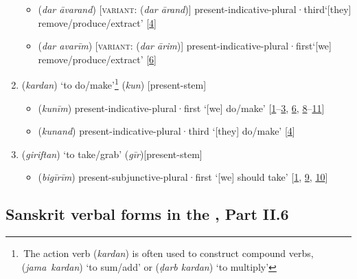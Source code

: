 \begin{enumerate}
\begin{itemize}
        \item {} (\textit{dar āvarand}) [\textsc{variant}:  (\textit{dar ārand})] \acrshort{present}-\acrshort{indicative}-\acrshort{plural}·\acrshort{third}\newline `[they] remove/produce/extract' [\hyperlink{Ppass4}{4}]
        \item {} (\textit{dar avarīm}) [\textsc{variant}:  (\textit{dar ārim})]
        \acrshort{present}-\acrshort{indicative}-\acrshort{plural}·\acrshort{first}\newline `[we] remove/produce/extract' [\hyperlink{Ppass6}{6}]
    \end{itemize}
    \item {} (\textit{kardan}) `to do/make'\footnote{\,The action verb  (\textit{kardan}) is often used to construct compound verbs, \eg {} (\textit{jama}\Ayn\ \textit{kardan}) `to sum/add' or  (\textit{ḍarb kardan}) `to multiply'\label{compound_action_verb_persian}} \hfill  {} (\textit{kun}) [\acrshort{present}-\acrshort{stem}]
    \begin{itemize}
        \item {} (\textit{kunīm}) \acrshort{present}-\acrshort{indicative}-\acrshort{plural}·\acrshort{first} `[we] do/make' [\hyperlink{Ppass1}{1}--\hyperlink{Ppass3}{3}, \hyperlink{Ppass6}{6}, \hyperlink{Ppass8}{8}--\hyperlink{Ppass11}{11}]
        \item {} (\textit{kunand}) \acrshort{present}-\acrshort{indicative}-\acrshort{plural}·\acrshort{third} `[they] do/make' [\hyperlink{Ppass4}{4}]
    \end{itemize}
    \item {} (\textit{giriftan}) `to take/grab' \hfill  {} (\textit{gīr})[\acrshort{present}-\acrshort{stem}]
    \begin{itemize}
        \item {} (\textit{bigīrīm}) \acrshort{present}-\acrshort{subjunctive}-\acrshort{plural}·\acrshort{first} `[we] should take' [\hyperlink{Ppass1}{1}, \hyperlink{Ppass9}{9}, \hyperlink{Ppass10}{10}]
    \end{itemize}
\end{enumerate}
\clearpage

\subsection{Sanskrit verbal forms in the \Siddhantasindhu, Part II.6} \label{sanskrit_verbs}

